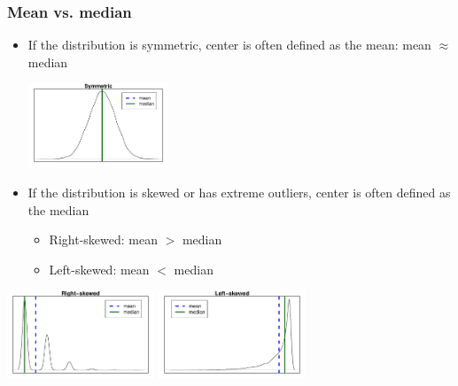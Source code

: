 \begin{frame}
\frametitle{Mean vs. median}

\begin{itemize}

\item If the distribution is symmetric, center is often defined as the mean: mean $\approx$ median

\begin{center}
\includegraphics[width=0.33\textwidth]{1-6_numerical_data/figures/mean_med/sym}
\end{center}

\item If the distribution is skewed or has extreme outliers, center is often defined as the median
\begin{itemize}
\item Right-skewed: mean $>$ median
\item Left-skewed: mean $<$ median \\
\end{itemize}

\end{itemize}

\begin{center}
\includegraphics[width=0.33\textwidth]{1-6_numerical_data/figures/mean_med/rs}
\includegraphics[width=0.33\textwidth]{1-6_numerical_data/figures/mean_med/ls}\\
\end{center}

\end{frame}



